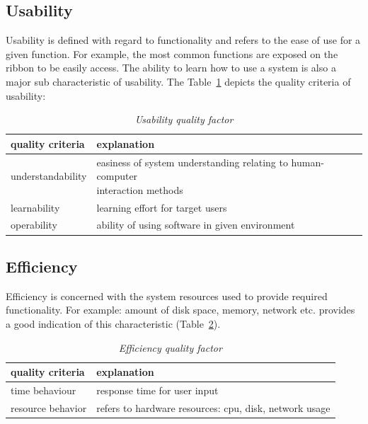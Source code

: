 \subsection{Usability}
Usability is defined with regard to functionality and refers to the ease of use for a given function. For example, the most common functions are exposed on the ribbon to be easily access. The ability to learn how to use a system is also a major sub characteristic of usability. The Table~\ref{tab:usability_factor} depicts the quality criteria of usability:

\begin{table}[h!]
	\centering
\begin{tabular}{|l|l|}
\hline
{\bf quality criteria} & {\bf explanation} \\
\hline
understandability & \parbox[t]{12cm}{easiness of system understanding relating to human-computer\\ interaction methods\\} \\
\hline
learnability & learning effort for target users \\
\hline
operability & ability of using software in given environment \\
\hline
\end{tabular}	
	\caption{\textit{Usability quality factor}}
	\label{tab:usability_factor}
\end{table}


\subsection{Efficiency}
Efficiency  is concerned with the system resources used to provide required functionality. For example: amount of disk space, memory, network etc. provides a good indication of this characteristic (Table~\ref{tab:efficiency_factor}).

\begin{table}[h!]
	\centering
\begin{tabular}{|l|l|}
\hline
{\bf quality criteria} & {\bf explanation} \\
\hline
time behaviour & response time for user input \\
\hline
resource behavior & refers to hardware resources: cpu, disk, network usage \\
\hline
\end{tabular}	
	\caption{\textit{Efficiency quality factor}}
	\label{tab:efficiency_factor}
\end{table} 


